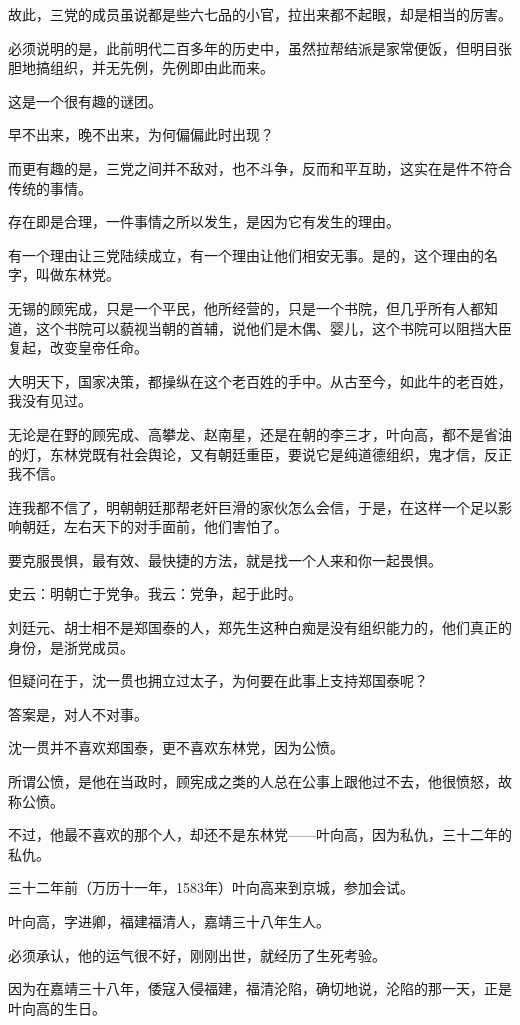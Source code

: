 \begin{multicols}{\theparacolNo}
		故此，三党的成员虽说都是些六七品的小官，拉出来都不起眼，却是相当的厉害。

		必须说明的是，此前明代二百多年的历史中，虽然拉帮结派是家常便饭，但明目张胆地搞组织，并无先例，先例即由此而来。

		这是一个很有趣的谜团。

		早不出来，晚不出来，为何偏偏此时出现？

		而更有趣的是，三党之间并不敌对，也不斗争，反而和平互助，这实在是件不符合传统的事情。

		存在即是合理，一件事情之所以发生，是因为它有发生的理由。

		有一个理由让三党陆续成立，有一个理由让他们相安无事。是的，这个理由的名字，叫做东林党。

		无锡的顾宪成，只是一个平民，他所经营的，只是一个书院，但几乎所有人都知道，这个书院可以藐视当朝的首辅，说他们是木偶、婴儿，这个书院可以阻挡大臣复起，改变皇帝任命。

		大明天下，国家决策，都操纵在这个老百姓的手中。从古至今，如此牛的老百姓，我没有见过。

		无论是在野的顾宪成、高攀龙、赵南星，还是在朝的李三才，叶向高，都不是省油的灯，东林党既有社会舆论，又有朝廷重臣，要说它是纯道德组织，鬼才信，反正我不信。

		连我都不信了，明朝朝廷那帮老奸巨滑的家伙怎么会信，于是，在这样一个足以影响朝廷，左右天下的对手面前，他们害怕了。

		要克服畏惧，最有效、最快捷的方法，就是找一个人来和你一起畏惧。

		史云：明朝亡于党争。我云：党争，起于此时。

		刘廷元、胡士相不是郑国泰的人，郑先生这种白痴是没有组织能力的，他们真正的身份，是浙党成员。

		但疑问在于，沈一贯也拥立过太子，为何要在此事上支持郑国泰呢？

		答案是，对人不对事。

		沈一贯并不喜欢郑国泰，更不喜欢东林党，因为公愤。

		所谓公愤，是他在当政时，顾宪成之类的人总在公事上跟他过不去，他很愤怒，故称公愤。

		不过，他最不喜欢的那个人，却还不是东林党——叶向高，因为私仇，三十二年的私仇。

		三十二年前（万历十一年，1583年）叶向高来到京城，参加会试。

		叶向高，字进卿，福建福清人，嘉靖三十八年生人。

		必须承认，他的运气很不好，刚刚出世，就经历了生死考验。

		因为在嘉靖三十八年，倭寇入侵福建，福清沦陷，确切地说，沦陷的那一天，正是叶向高的生日。


\end{multicols}
